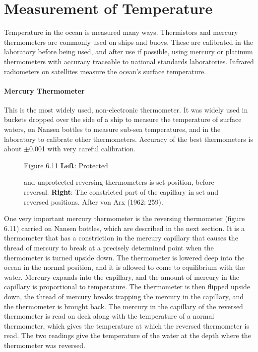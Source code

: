 \section{Measurement of Temperature}
Temperature in the ocean is
measured many ways. Thermistors and mercury thermometers are commonly
used on ships and buoys. These are calibrated in the laboratory before
being used, and after use if possible, using mercury or platinum
thermometers with accuracy
traceable to national standards laboratories. Infrared radiometers on
satellites measure the ocean's surface temperature.

\paragraph{Mercury Thermometer} This is the most widely used,
non-electronic
thermometer. It was widely used in buckets dropped over the side of a
ship to measure the temperature of surface waters, on Nansen bottles
to measure sub-sea temperatures, and in the laboratory to calibrate
other thermometers. Accuracy of
the best thermometers is about $\pm$0.001 with very careful
calibration.

\begin{figure}[t!]
\footnotesize
Figure 6.11 \textbf{Left}: Protected \rule{0mm}{4ex} and unprotected
reversing thermometers is set position,
before reversal.
\textbf{Right}: The constricted part of the capillary in set and
reversed positions. After von Arx (1962: 259).
\label{fig:thermometer}
\vspace{-3ex}
\end{figure}

One very important mercury thermometer is the reversing
thermometer (figure 6.11) carried on
Nansen bottles, which are described in the next section. It is a
thermometer that has a constriction in the mercury capillary that
causes the thread of mercury to break at a precisely determined point
when the thermometer is turned upside down. The thermometer is lowered
deep into the ocean in the normal position, and it is allowed to come
to equilibrium with the water. Mercury expands into the capillary, and
the amount of mercury in the capillary is proportional to
temperature. The thermometer is then flipped upside down, the thread
of mercury breaks trapping the mercury in the capillary, and the
thermometer is brought back. The mercury in the capillary of the
reversed thermometer is read on deck along with the temperature of a
normal thermometer, which gives the temperature at which the reversed
thermometer is read. The two readings give the temperature of the
water at the depth where the thermometer was reversed.

